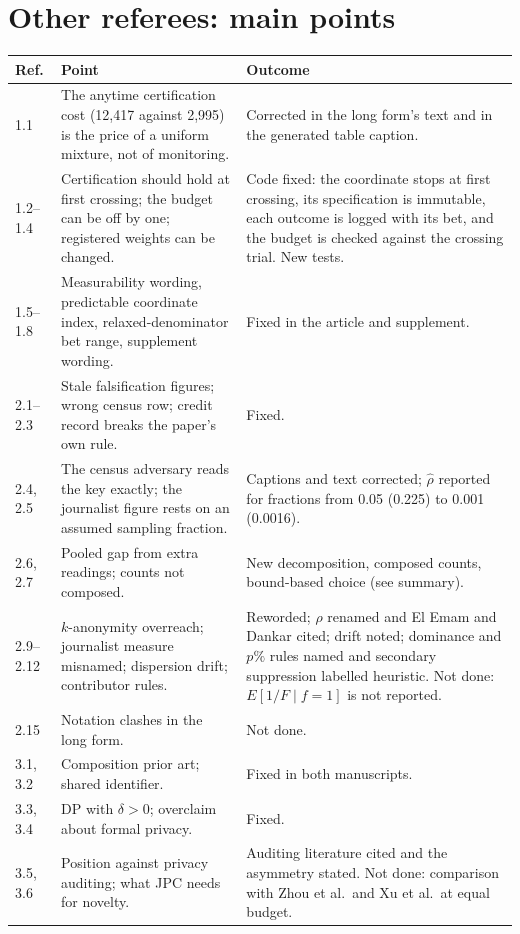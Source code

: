 \documentclass[11pt,a4paper]{article}
\begin{document}
\section*{Other referees: main points}
\begin{longtable}{@{}p{0.9cm}p{7.8cm}p{6.4cm}@{}}
\toprule
Ref. & Point & Outcome\\\midrule\endhead
1.1 & The anytime certification cost (12,417 against 2,995) is the price of a uniform
mixture, not of monitoring. & Corrected in the long form's text and in the generated
table caption.\\
1.2--1.4 & Certification should hold at first crossing; the budget can be off by one;
registered weights can be changed. & Code fixed: the coordinate stops at first crossing,
its specification is immutable, each outcome is logged with its bet, and the budget is
checked against the crossing trial. New tests.\\
1.5--1.8 & Measurability wording, predictable coordinate index, relaxed-denominator bet
range, supplement wording. & Fixed in the article and supplement.\\
2.1--2.3 & Stale falsification figures; wrong census row; credit record breaks the
paper's own rule. & Fixed.\\
2.4, 2.5 & The census adversary reads the key exactly; the journalist figure rests on an
assumed sampling fraction. & Captions and text corrected; $\hat\rho$ reported for
fractions from 0.05 (0.225) to 0.001 (0.0016).\\
2.6, 2.7 & Pooled gap from extra readings; counts not composed. & New decomposition,
composed counts, bound-based choice (see summary).\\
2.9--2.12 & $k$-anonymity overreach; journalist measure misnamed; dispersion drift;
contributor rules. & Reworded; $\rho$ renamed and El Emam and Dankar cited; drift noted;
dominance and $p\%$ rules named and secondary suppression labelled heuristic. Not done:
$E[1/F\mid f=1]$ is not reported.\\
2.15 & Notation clashes in the long form. & Not done.\\
3.1, 3.2 & Composition prior art; shared identifier. & Fixed in both manuscripts.\\
3.3, 3.4 & DP with $\delta>0$; overclaim about formal privacy. & Fixed.\\
3.5, 3.6 & Position against privacy auditing; what JPC needs for novelty. & Auditing
literature cited and the asymmetry stated. Not done: comparison with Zhou et al.\ and
Xu et al.\ at equal budget.\\

\end{longtable}
\end{document}
